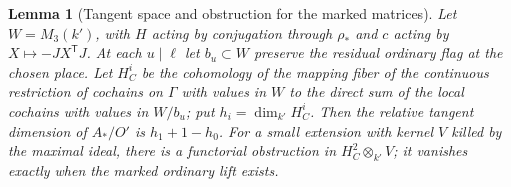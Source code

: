 \documentclass[a4paper,11pt]{article}
\newtheorem{lemma}[proposition]{Lemma}
\theoremstyle{definition}
\theoremstyle{remark}
\numberwithin{equation}{section}
\begin{document}
\begin{lemma}[Tangent space and obstruction for the marked matrices]\leavevmode
\label{lem:markedcomplex420}
Let \(W=M_3(k')\), with \(H\) acting by conjugation through
\(\rho_*\) and \(c\) acting by \(X\mapsto-JX^{\mathsf T}J\).
At each \(u\mid\ell\) let \(b_u\subset W\) preserve the residual
ordinary flag at the chosen place. Let \(H^i_C\) be the cohomology
of the mapping fiber of the continuous restriction of cochains
on \(\Gamma\) with values in \(W\) to the direct sum of the
local cochains with values in \(W/b_u\); put \(h_i=\dim_{k'}H^i_C\).
Then the relative tangent dimension of \(A_*/O'\) is
\(h_1+1-h_0\). For a small extension with kernel \(V\)
killed by the maximal ideal, there is a functorial obstruction
in \(H_C^2\otimes_{k'}V\); it vanishes exactly when the marked
ordinary lift exists.
\end{lemma}
\end{document}
